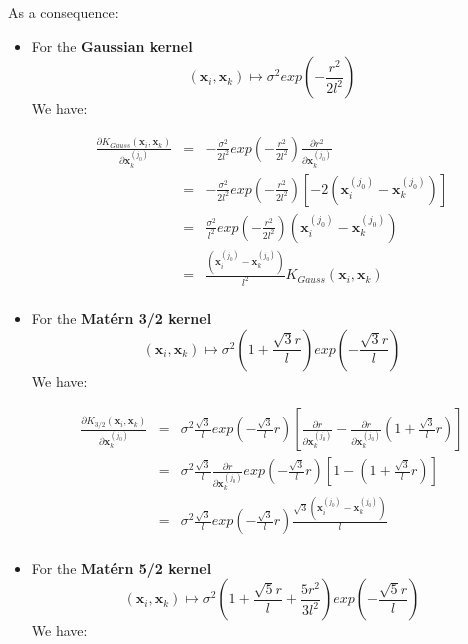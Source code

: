 As a consequence: 

\begin{itemize}

\item For the \textbf{Gaussian kernel} 
$$
(\textbf{x}_i, \textbf{x}_k) \mapsto \sigma^2 exp \left( -\frac{r^2}{2l^2} \right)
$$ 
We have:

\begin{eqnarray*}
\frac{\partial K_{Gauss}(\textbf{x}_i, \textbf{x}_k)}{\partial \textbf{x}_k^{(j_0)}} &=& -\frac{\sigma^2}{2l^2} exp \left(-\frac{r^2}{2l^2} \right) \frac{\partial r^2}{\partial \textbf{x}_k^{(j_0)}}\\
&=& -\frac{\sigma^2}{2l^2} exp \left(-\frac{r^2}{2l^2} \right) \left[ -2\left(\textbf{x}_i^{(j_0)} - \textbf{x}_k^{(j_0)} \right) \right]\\
&=& \frac{\sigma^2}{l^2} exp \left(-\frac{r^2}{2l^2} \right) \left(\textbf{x}_i^{(j_0)} - \textbf{x}_k^{(j_0)} \right) \\
&=& \frac{\left(\textbf{x}_i^{(j_0)} - \textbf{x}_k^{(j_0)} \right)}{l^2} K_{Gauss}(\textbf{x}_i, \textbf{x}_k)\\
\end{eqnarray*}

\item For the \textbf{Mat\'ern 3/2 kernel} 
$$
(\textbf{x}_i, \textbf{x}_k) \mapsto \sigma^2 \left( 1 + \frac{\sqrt{3}r}{l} \right) exp \left( - \frac{\sqrt{3}r}{l} \right)
$$ 
We have:

\begin{eqnarray*}
\frac{\partial K_{3/2}(\textbf{x}_i, \textbf{x}_k)}{\partial \textbf{x}_k^{(j_0)}} &=& \sigma^2 \frac{\sqrt{3}}{l} exp \left( - \frac{\sqrt{3}}{l} r\right) \left[   \frac{\partial r}{\partial \textbf{x}_k^{(j_0)}}  - \frac{\partial r}{\partial \textbf{x}_k^{(j_0)}} \left( 1 + \frac{\sqrt{3}}{l}r \right) \right]\\
&=&  \sigma^2 \frac{\sqrt{3}}{l} \frac{\partial r}{\partial \textbf{x}_k^{(j_0)}} exp \left( - \frac{\sqrt{3}}{l} r\right) \left[1  -  \left( 1 + \frac{\sqrt{3}}{l}r \right) \right]\\
&=& \sigma^2 \frac{\sqrt{3}}{l} exp \left( - \frac{\sqrt{3}}{l} r\right) \frac{\sqrt{3}\left(\textbf{x}_i^{(j_0)} - \textbf{x}_k^{(j_0)} \right)}{l} \\
\end{eqnarray*}

\item For the \textbf{Mat\'ern 5/2 kernel} 
$$
(\textbf{x}_i, \textbf{x}_k) \mapsto \sigma^2 \left( 1 + \frac{\sqrt{5}r}{l} + \frac{5 r^2}{3 l^2} \right) exp \left( - \frac{\sqrt{5}r}{l} \right)
$$
We have:


\end{itemize}

